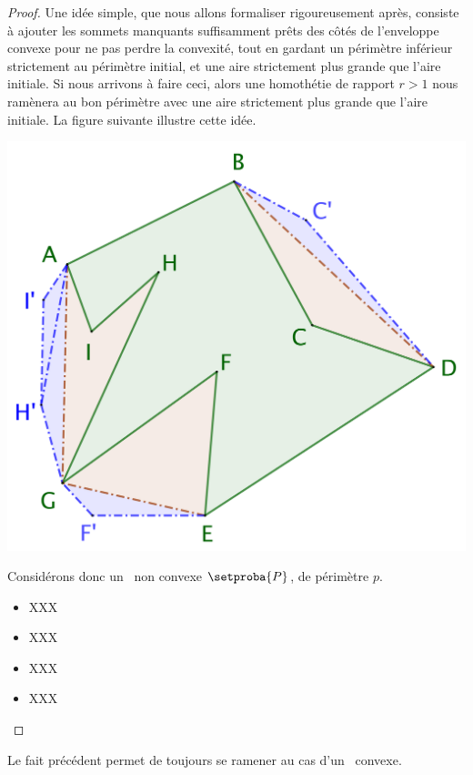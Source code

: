 \begin{proof}
	Une idée simple, que nous allons formaliser rigoureusement après, consiste à ajouter les sommets manquants suffisamment prêts des côtés de l'enveloppe convexe pour ne pas perdre la convexité, tout en gardant un périmètre inférieur strictement au périmètre initial, et une aire strictement plus grande que l'aire initiale. Si nous arrivons à faire ceci, alors une homothétie de rapport $r > 1$ nous ramènera au bon périmètre avec une aire strictement plus grande que l'aire initiale.
	La figure suivante illustre cette idée.	
	
	\begin{center}
		\includegraphics[scale=.4]{content/polygon/polygon-convex-hull-distortion.png}
	\end{center}

	Considérons donc un \ngone\ non convexe $\setproba{P}$, de périmètre $p$.
	\begin{itemize}
		\item XXX

		\item XXX

		\item XXX

		\item XXX
	\end{itemize}
\end{proof}


\begin{remark}
	Le fait précédent permet de toujours se ramener au cas d'un \ngone\ convexe.
\end{remark}


